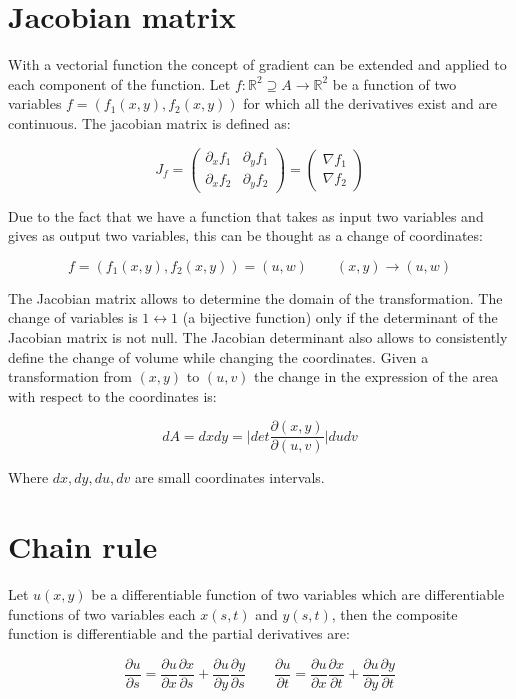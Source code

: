 \section{Jacobian matrix}
With a vectorial function the concept of gradient can be extended and applied to each component of the function.
Let $f:\mathbb{R}^2\supseteq A\rightarrow\mathbb{R}^2$ be a function of two variables $f = (f_1(x, y), f_2(x, y))$ for which all the derivatives exist and are continuous.
The jacobian matrix is defined as:

$$J_f = \begin{pmatrix} \partial_x f_1 & \partial_y f_1\\\partial_x f_2 & \partial_y f_2\end{pmatrix} = \begin{pmatrix} \nabla f_1\\\nabla f_2\end{pmatrix}$$

Due to the fact that we have a function that takes as input two variables and gives as output two variables, this can be thought as a change of coordinates:

$$f = (f_1(x, y), f_2(x, y)) = (u, w)\qquad (x, y)\rightarrow (u, w)$$

The Jacobian matrix allows to determine the domain of the transformation.
The change of variables is $1\leftrightarrow 1$ (a bijective function) only if the determinant of the Jacobian matrix is not null.
The Jacobian determinant also allows to consistently define the change of volume while changing the coordinates.
Given a transformation from $(x, y)$ to $(u, v)$ the change in the expression of the area with respect to the coordinates is:

$$dA = dxdy = \biggl| det\frac{\partial(x, y)}{\partial(u, v)}\biggr|dudv$$

Where $dx, dy, du, dv$ are small coordinates intervals.

\section{Chain rule}
Let $u(x, y)$ be a differentiable function of two variables which are differentiable functions of two variables each $x(s, t)$ and $y(s, t)$, then the composite function is differentiable and the partial derivatives are:

$$\frac{\partial u}{\partial s} = \frac{\partial u}{\partial x}\frac{\partial x}{\partial s} + \frac{\partial u}{\partial y}\frac{\partial y}{\partial s}\qquad\frac{\partial u}{\partial t} = \frac{\partial u}{\partial x}\frac{\partial x}{\partial t} + \frac{\partial u}{\partial y}\frac{\partial y}{\partial t}$$

